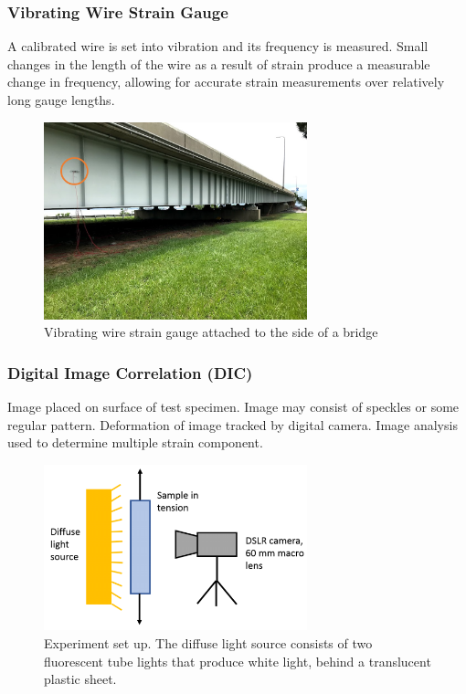 \subsubsection{Vibrating Wire Strain Gauge}
A calibrated wire is set into vibration and its frequency is measured. Small changes in the length of the wire as a result of strain produce a measurable change in frequency, allowing for accurate strain measurements over relatively long gauge lengths.

\begin{figure}[!h]
\centering
\includegraphics[angle=0, width=3in]{Strain-Figures/VibratingWire.png}
\vspace{-2mm}
\caption{\small Vibrating wire strain gauge attached to the side of a bridge}
\vspace{-3mm}
\label{Fig:VibeWire}
\end{figure}

\subsubsection{Digital Image Correlation (DIC)}

Image placed on surface of test specimen. Image may consist of speckles or some regular pattern. Deformation of image tracked by digital camera. Image analysis used to determine multiple strain component.

\begin{figure}[!h]
\centering
\includegraphics[angle=0, width=3in]{Strain-Figures/dic.png}
\vspace{-2mm}
\caption{\small Experiment set up. The diffuse light source consists of two fluorescent tube lights that produce white light, behind a translucent plastic sheet.}
\vspace{-3mm}
\label{Fig:dic}
\end{figure}

